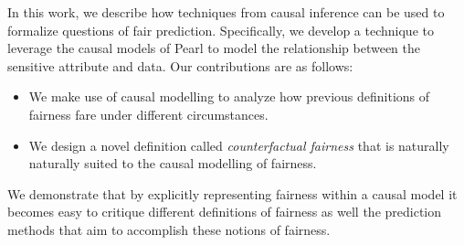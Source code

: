In this work, we describe how techniques from causal inference can be used to formalize questions of fair prediction. Specifically, we develop a technique to leverage the causal models of Pearl \cite{pearl2009causal} to model the relationship between the sensitive attribute and data. Our contributions are as follows:
\begin{itemize}
    \item We make use of causal modelling to analyze how previous definitions of fairness fare under different circumstances.
    \item We design a novel definition called \emph{counterfactual fairness} that is naturally naturally suited to the causal modelling of fairness.
\end{itemize}
We demonstrate that by explicitly representing fairness within a causal model it becomes easy to critique different definitions of fairness as well the prediction methods that aim to accomplish these notions of fairness.











